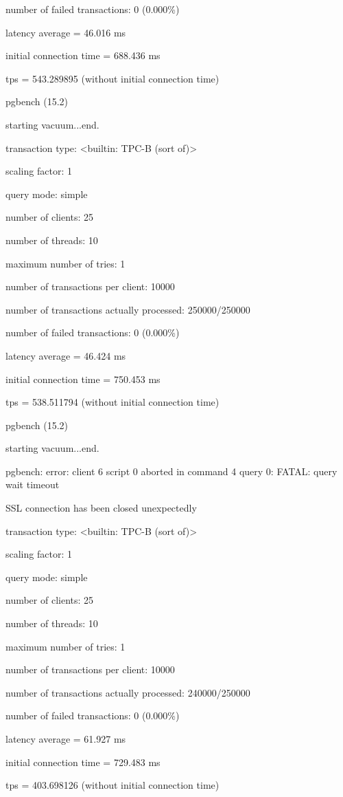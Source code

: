 number of failed transactions: 0 (0.000\%)

latency average = 46.016 ms

initial connection time = 688.436 ms

tps = 543.289895 (without initial connection time)

pgbench (15.2)

starting vacuum...end.

transaction type: <builtin: TPC-B (sort of)>

scaling factor: 1

query mode: simple

number of clients: 25

number of threads: 10

maximum number of tries: 1

number of transactions per client: 10000

number of transactions actually processed: 250000/250000

number of failed transactions: 0 (0.000\%)

latency average = 46.424 ms

initial connection time = 750.453 ms

tps = 538.511794 (without initial connection time)


pgbench (15.2)

starting vacuum...end.

pgbench: error: client 6 script 0 aborted in command 4 query 0: FATAL:  query wait timeout

SSL connection has been closed unexpectedly

transaction type: <builtin: TPC-B (sort of)>

scaling factor: 1

query mode: simple

number of clients: 25

number of threads: 10

maximum number of tries: 1

number of transactions per client: 10000

number of transactions actually processed: 240000/250000

number of failed transactions: 0 (0.000\%)

latency average = 61.927 ms

initial connection time = 729.483 ms

tps = 403.698126 (without initial connection time)

